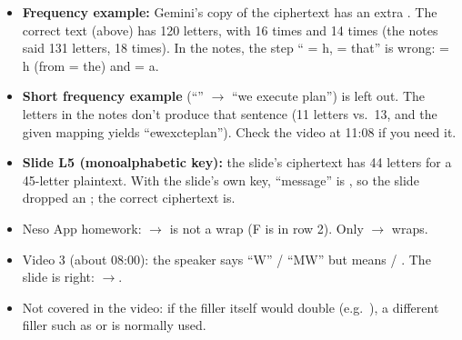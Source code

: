 \begin{fixbox}
\begin{itemize}
  \item \textbf{Frequency example:} Gemini's copy of the ciphertext has an extra . The correct text (above) has 120 letters, with  16 times and  14 times (the notes said 131 letters,  18 times). In the notes, the step `` = h,  = that'' is wrong:  = h (from  = the) and  = a.
  \item \textbf{Short frequency example} (``'' $\to$ ``we execute plan'') is left out. The letters in the notes don't produce that sentence (11 letters vs.\ 13, and the given mapping yields ``ewexcteplan''). Check the video at 11:08 if you need it.
  \item \textbf{Slide L5 (monoalphabetic key):} the slide's ciphertext  has 44 letters for a 45-letter plaintext. With the slide's own key, ``message'' is , so the slide dropped an ; the correct ciphertext is\newline {}.
  \item Neso App homework: $\to$ is not a wrap (F is in row 2). Only $\to$ wraps.
  \item Video 3 (about 08:00): the speaker says ``W'' / ``MW'' but means  / . The slide is right: $\to$.
  \item Not covered in the video: if the filler itself would double (e.g.\ ), a different filler such as  or  is normally used.
\end{itemize}
\end{fixbox}
